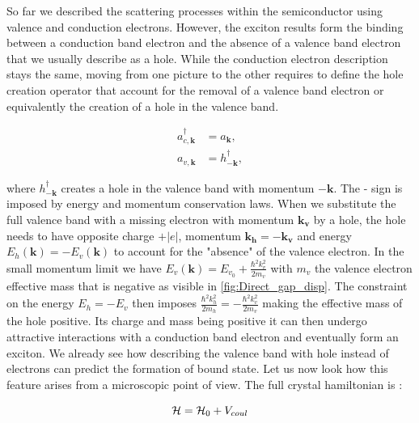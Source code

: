 \label{sub:electron_hole_picture}
So far we described the scattering processes within the semiconductor using valence and conduction electrons. However, the exciton results form the binding between a conduction band electron and the absence of a valence band electron that we usually describe as a hole.
While the conduction electron description stays the same, moving from one picture to the other requires to define the hole creation operator that account for the removal of a valence band electron or equivalently the creation of a hole in the valence band.


\begin{subequations}
    \label{eq:hole_creation_operators} %
    \begin{align}
        a^{\dagger}_{c,\mathbf{k}} &= a_{\mathbf{k}},\label{eq:electron_operator} \\
        a_{v,\mathbf{k}} &= h^{\dagger}_{\mathbf{-k}},\label{eq:hole_operator}
    \end{align}
\end{subequations}


\noindent where $h^{\dagger}_{\mathbf{-k}}$ creates a hole in the valence band with momentum $-\mathbf{k}$. The - sign 
is imposed by energy and momentum conservation laws. When we substitute the full valence band with a missing electron with momentum $\mathbf{k_v}$ by a hole, the hole needs to have opposite charge $+|e|$, momentum $\mathbf{k_h}=-\mathbf{k_v}$ and energy $E_h(\mathbf{k})=-E_v(\mathbf{k})$ to account for the "absence" of the valence electron. 
In the small momentum limit we have $E_v(\mathbf{k}) = E_{v_0}+ \frac{\hbar^2 k_v^2}{2m_v}$ with $m_v$ the valence electron effective mass that is negative as visible in \autoref{fig:Direct_gap_disp}.
The constraint on the energy $E_h = -E_v$ then imposes $ \frac{\hbar^2 k_h^2}{2m_h} = - \frac{\hbar^2 k_v^2}{2m_v}$ making the effective mass of the hole positive. Its charge and mass being positive it can then undergo attractive interactions 
with a conduction band electron and eventually form an exciton. We already see how describing the valence band with hole instead of electrons can predict the formation of bound state.
Let us now look how this feature arises from a microscopic point of view. The full crystal hamiltonian is :

\begin{equation}
    \mathcal{H} =  \mathcal{H}_0 + V_{coul}
    \label{eq:crystal_hamiltonian}
\end{equation}


